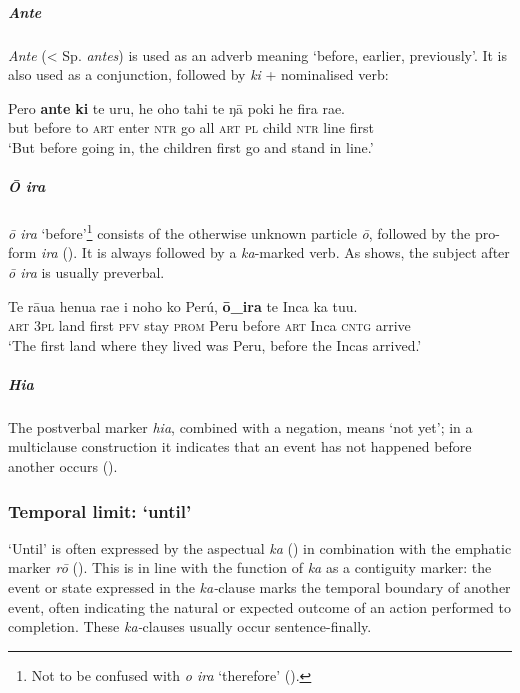 \subparagraph{\textit{Ante}} \textit{Ante} ({\textless} Sp. \textit{antes}) is used as an adverb meaning ‘before, earlier, previously’. It is also used as a conjunction, followed by \textit{ki} + nominalised verb:

\ea\label{ex:11.235}
\gll Pero \textbf{ante} \textbf{ki} te uru, he oho tahi te ŋā poki he fira ra{\ꞌ}e. \\
but before to \textsc{art} enter \textsc{ntr} go all \textsc{art} \textsc{pl} child \textsc{ntr} line first \\

\glt 
‘But before going in, the children first go and stand in line.’ \textstyleExampleref{[R151.012]} 
\z

\subparagraph{\textit{{\ꞌ}Ō ira}} \textit{{\ꞌ}ō ira} ‘before’\footnote{\label{fn:531}Not to be confused with \textit{{\ꞌ}o ira} ‘therefore’ ().} consists of the otherwise unknown particle \textit{{\ꞌ}ō}, followed by the pro-form \textit{ira} (). It is always followed by a \textit{ka}{}-marked verb. As  shows, the subject after \textit{{\ꞌ}ō ira} is usually preverbal.

\ea\label{ex:11.236}
\gll Te rāua henua ra{\ꞌ}e i noho ko Perú, \textbf{{\ꞌ}ō\_ira} te Inca ka tu{\ꞌ}u. \\
\textsc{art} \textsc{3pl} land first \textsc{pfv} stay \textsc{prom} Peru  before \textsc{art} Inca \textsc{cntg} arrive \\

\glt 
‘The first land where they lived was Peru, before the Incas arrived.’ \textstyleExampleref{[R376.011]} 
\z

\subparagraph{\textit{Hia}} The postverbal marker \textit{hia}, combined with a negation, means ‘not yet’; in a multiclause construction it indicates that an event has not happened before another occurs ().

\subsubsection{Temporal limit: ‘until’}\label{sec:11.6.2.5}

‘Until’ is often expressed by the aspectual \textit{ka} () in combination with the emphatic marker \textit{rō} (). This is in line with the function of \textit{ka} as a contiguity marker: the event or state expressed in the \textit{ka-}clause marks the temporal boundary of another event, often indicating the natural or expected outcome of an action performed to completion. These \textit{ka-}clauses usually occur sentence-finally.

